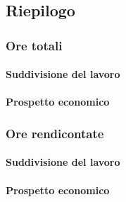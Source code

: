 \subsection{Riepilogo}
\subsubsection{Ore totali}
\paragraph{Suddivisione del lavoro}
\paragraph{Prospetto economico}

\subsubsection{Ore rendicontate}
\paragraph{Suddivisione del lavoro}
\paragraph{Prospetto economico}
